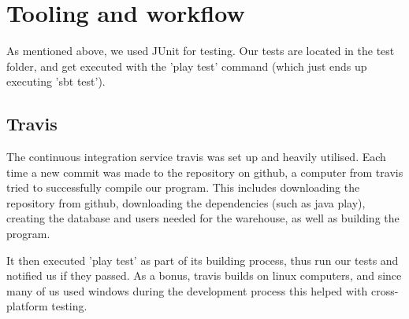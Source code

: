 \section{Tooling and workflow}

As mentioned above, we used JUnit for testing. Our tests are located in the test folder, and get executed with
the 'play test' command  (which just ends up executing 'sbt test').

\subsection{Travis}
The continuous integration service travis was set up and heavily utilised. 
Each time a new commit was made to the repository on github, a computer from travis 
tried to successfully compile our program. This includes downloading the repository from github,
downloading the dependencies (such as java play),
creating the database and users needed for the warehouse, as well as building the program.

It then executed 'play test' as part of its building process, thus run our tests and notified us if they passed. As a bonus, travis builds on linux computers, and since many of us used windows during the development process this helped with cross-platform testing.
